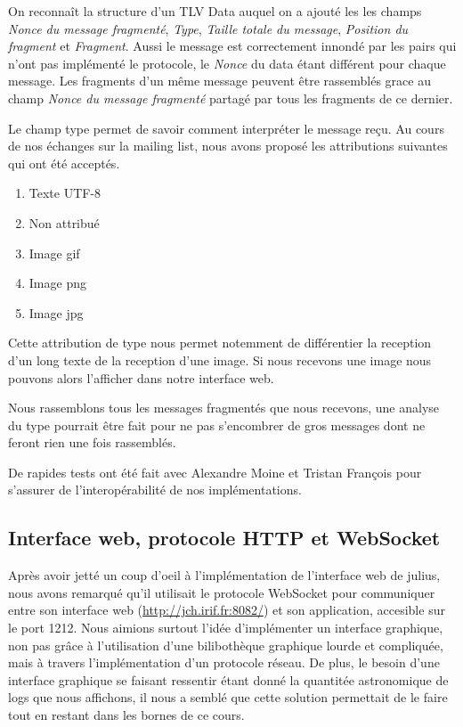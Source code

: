 \documentclass[a4paper,10pt]{article} %
\begin{document}
On reconnaît la structure d'un TLV Data auquel on a ajouté les les champs \textit{Nonce du message fragmenté}, \textit{Type}, \textit{Taille totale du message}, \textit{Position du fragment} et \textit{Fragment}. Aussi le message est correctement innondé par les pairs qui n'ont pas implémenté le protocole, le \textit{Nonce} du data étant différent pour chaque message. Les fragments d'un même message peuvent être rassemblés grace au champ \textit{Nonce du message fragmenté} partagé par tous les fragments de ce dernier.

Le champ type permet de savoir comment interpréter le message reçu. Au cours de nos échanges sur la mailing list, nous avons proposé les attributions suivantes qui ont été acceptés.

\begin{enumerate}
\item Texte UTF-8
\item Non attribué
\item Image gif
\item Image png
\item Image jpg
\end{enumerate}

Cette attribution de type nous permet notemment de différentier la reception d'un long texte de la reception d'une image. Si nous recevons une image nous pouvons alors l'afficher dans notre interface web.

Nous rassemblons tous les messages fragmentés que nous recevons, une analyse du type pourrait être fait pour ne pas s'encombrer de gros messages dont ne feront rien une fois rassemblés.

De rapides tests ont été fait avec \textrm{Alexandre Moine} et \textrm{Tristan François} pour s'assurer de l'interopérabilité de nos implémentations.

\subsection{Interface web, protocole HTTP et WebSocket\label{sec:web}}

Après avoir jetté un coup d'oeil à l'implémentation de l'interface web de julius, nous avons remarqué qu'il utilisait le protocole WebSocket pour communiquer entre son interface web (\href{http://jch.irif.fr:8082/}{http://jch.irif.fr:8082/}) et son application, accesible sur le port 1212. Nous aimions surtout l'idée d'implémenter un interface graphique, non pas grâce à l'utilisation d'une bilibothèque graphique lourde et compliquée, mais à travers l'implémentation d'un protocole réseau. De plus, le besoin d'une interface graphique se faisant ressentir étant donné la quantitée astronomique de logs que nous affichons, il nous a semblé que cette solution permettait de le faire tout en restant dans les bornes de ce cours.
\end{document}
